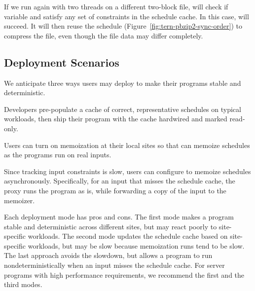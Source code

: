 If we run \pbzip again with two threads on a different two-block file,
\tern will check if variable  and  satisfy any set of
constraints in the schedule cache.  In this case, \tern will succeed.  It
will then reuse the schedule (Figure~\ref{fig:tern-pbzip2-sync-order}) to
compress the file, even though the file data may differ completely.


\subsection{Deployment Scenarios} \label{sec:tern-offline}

We anticipate three ways users may deploy \tern to make their programs
stable and deterministic.

 Developers pre-populate a cache of correct,
representative schedules on typical workloads, then ship their program
with the cache hardwired and marked read-only.

  Users can turn on memoization at their local
sites so that \tern can memoize schedules as the programs run on real
inputs.

 Since tracking input constraints is slow, users
can configure \tern to memoize schedules asynchronously.  Specifically, for
an input that misses the schedule cache, the proxy runs the program as is,
while forwarding a copy of the input to the memoizer.

\para{} Each deployment mode has pros and cons.  The first mode makes a
program stable and deterministic across different sites, but may react
poorly to site-specific workloads.  The second mode updates the schedule
cache based on site-specific workloads, but may be slow because
memoization runs tend to be slow.  The last approach avoids the slowdown,
but allows a program to run nondeterministically when an input misses the
schedule cache.  For server programs with high performance requirements,
we recommend the first and the third modes.




